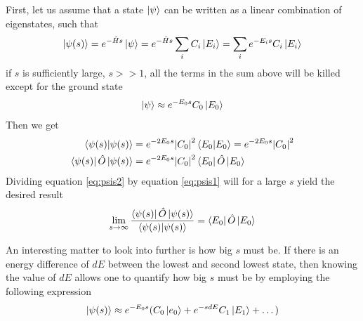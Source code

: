 \documentclass{article}
\begin{document}
First, let us assume that a state $\ket{\psi}$ can be written as a linear combination of eigenstates, such that
\begin{equation*}
\ket{\psi(s)}=e^{-\hat{H}s}\ket{\psi}=e^{-\hat{H}s}\sum_i C_i\ket{E_i}=\sum_i e^{-E_i s}C_i\ket{E_i}
\end{equation*}
if $s$ is sufficiently large, $s>>1$, all the terms in the sum above will be killed except for the ground state 
\begin{equation*}
\ket{\psi} \approx e^{-E_0s}C_0\ket{E_0}
\end{equation*}
Then we get
\begin{align}
\braket{\psi(s)} &= e^{-2E_0s}\abs{C_0}^2\braket{E_0}=e^{-2E_0s}\abs{C_0}^2 \label{eq:psis1} \\
\bra{\psi(s)}\hat{O}\ket{\psi(s)} &= e^{-2E_0s}\abs{C_0}^2\bra{E_0}\hat{O}\ket{E_0} \label{eq:psis2}
\end{align}
Dividing equation \ref{eq:psis2} by equation \ref{eq:psis1} will for a large $s$ yield the desired result
\begin{equation}
\lim_{s\to\infty}\frac{\bra{\psi(s)}\hat{O}\ket{\psi(s)}}{\braket{\psi(s)}}=\bra{E_0}\hat{O}\ket{E_0}
\end{equation}

An interesting matter to look into further is how big $s$ must be. If there is an energy difference of $dE$ between the lowest and second lowest state, then knowing the value of $dE$ allows one to quantify how big $s$ must be by employing the following expression
\begin{equation*}
\ket{\psi(s)}\approx e^{-E_0s}(C_0\ket{e_0}+e^{-sdE}C_1\ket{E_1}+\dots)
\end{equation*}
\end{document}

